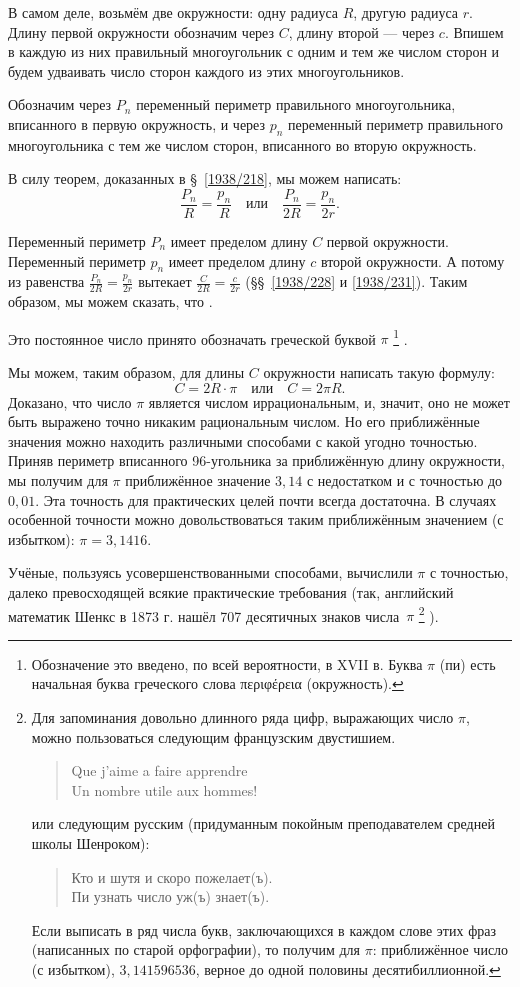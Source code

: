 \documentclass[oneside]{book}
\begin{document}
В самом деле, возьмём две окружности:
одну радиуса $R$, другую радиуса $r$.
Длину первой окружности обозначим через $C$, длину второй — через $c$.
Впишем в каждую из них правильный многоугольник с одним и тем же числом сторон и будем удваивать число сторон каждого из этих многоугольников.

Обозначим через $P_n$ переменный периметр правильного многоугольника, вписанного в первую окружность, и через $p_n$ переменный периметр правильного многоугольника с тем же числом сторон, вписанного во вторую окружность.

В силу теорем, доказанных в §~\ref{1938/218}, мы можем написать:
\[\frac{P_n}{R}=\frac{p_n}{R}
\quad\text{или}\quad
\frac{P_n}{2R}=\frac{p_n}{2r}.\]

Переменный периметр $P_n$ имеет пределом длину $C$ первой окружности.
Переменный периметр $p_n$ имеет пределом длину $c$ второй окружности.
А потому из равенства $\frac{P_n}{2R}=\frac{p_n}{2r}$ вытекает $\frac{C}{2R}=\frac{c}{2r}$
(§§~\ref{1938/228} и \ref{1938/231}).
Таким образом, мы можем сказать, что . %

Это постоянное число принято обозначать греческой буквой $\pi$%
\footnote{Обозначение это введено, по всей вероятности, в XVII в.
Буква $\pi$ (пи) есть начальная буква греческого слова \textgreek{περιφέρεια} (окружность).}%
.

Мы можем, таким образом, для длины $C$ окружности написать такую формулу:
\[C=2R\cdot\pi
\quad\text{или}\quad
C=2\pi R.
\]
Доказано, что число $\pi$ является числом иррациональным, и, значит, оно не может быть выражено точно никаким рациональным числом.
Но его приближённые значения можно находить различными способами с какой угодно точностью.
Приняв периметр вписанного 96-угольника за приближённую длину окружности, мы получим для $\pi$ приближённое значение $3{,}14$ с недостатком и с точностью до $0{,}01$.
Эта точность для практических целей почти всегда достаточна.
В случаях особенной точности можно довольствоваться таким приближённым значением (с избытком):
$\pi = 3{,}1416$.

Учёные, пользуясь усовершенствованными способами, вычислили $\pi$ с точностью, далеко превосходящей всякие практические требования (так, английский математик Шенкс в 1873 г.
нашёл 707 десятичных знаков числа~$\pi$%
\footnote{Для запоминания довольно длинного ряда цифр, выражающих число $\pi$, можно пользоваться следующим французским двустишием.
\begin{verse}
Que j'aime a faire apprendre\\
Un nombre utile aux hommes!
\end{verse}
или следующим русским (придуманным покойным преподавателем средней школы Шенроком):
\begin{verse}
Кто и шутя и скоро пожелает(ъ).\\
Пи узнать число уж(ъ) знает(ъ).
\end{verse}
Если выписать в ряд числа букв, заключающихся в каждом слове этих фраз (написанных по старой орфографии), то получим для $\pi$:
приближённое число (с избытком), $3{,}141596536$, верное до одной половины десятибиллионной.}%
).
\end{document}
